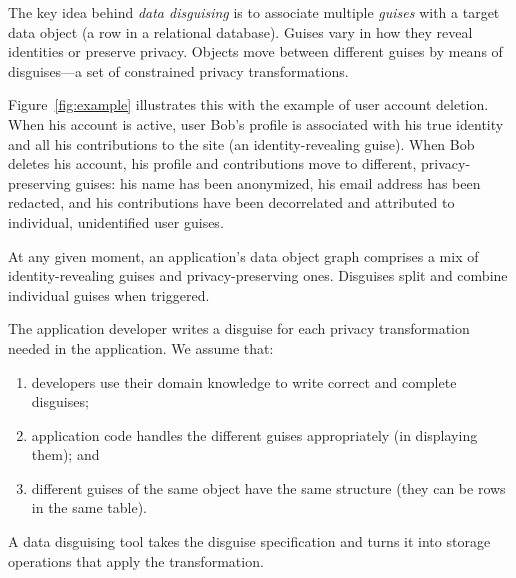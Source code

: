 %
The key idea behind \emph{data disguising} is to associate multiple \emph{guises} with a target data
object (\ie a row in a relational database). Guises vary in how they reveal identities or preserve privacy.
%
Objects move between different guises by means of disguises---a set of constrained privacy
transformations.

Figure~\ref{fig:example} illustrates this with the example of user account deletion.
%
When his account is active, user Bob's profile is associated with his true identity and all his
contributions to the site (an identity-revealing guise).
%
When Bob deletes his account, his profile and contributions move to different, privacy-preserving
guises: his name has been anonymized, his email address has been redacted, and his contributions
have been decorrelated and attributed to individual, unidentified user guises.
%

At any given moment, an application's data object graph comprises a mix of identity-revealing guises
and privacy-preserving ones. Disguises split and combine individual guises when triggered.

%
The application developer writes a disguise for each privacy transformation needed
in the application.
%
%
We assume that:
\begin{enumerate}[nosep]
  \item developers use their domain knowledge to write correct and complete disguises;
  \item application code handles the different guises appropriately (\eg in
    displaying them); and
  \item different guises of the same object have the same structure (\eg they can be
    rows in the same table).
\end{enumerate}
%
A data disguising tool takes the disguise specification and turns it into storage operations that
apply the transformation.

%
%
%

